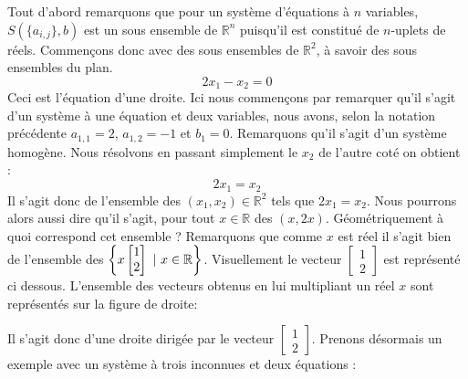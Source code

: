 \noindent Tout d'abord remarquons que pour un système d'équations à $n$ variables, $S(\{a_{i,j}\}, b)$ est un sous ensemble de $\mathbb{R}^n$ puisqu'il est constitué de $n$-uplets de réels. Commençons donc avec des sous ensembles de $\mathbb{R}^2$, à savoir des sous ensembles du plan. 
$$ 2x_1 - x_2 = 0 $$
\noindent Ceci est l'équation d'une droite. Ici nous commençons par remarquer qu'il s'agit d'un système à une équation et deux variables, nous avons, selon la notation précédente $a_{1,1} =2 $, $a_{1,2} = -1$ et  $b_1 = 0$. Remarquons qu'il s'agit d'un système homogène. Nous résolvons en passant simplement le $x_2$ de l'autre coté on obtient :
$$2x_1 = x_2$$
Il s'agit donc de l'ensemble des $(x_1, x_2) \in \mathbb{R}^2$ tels que $2x_1 = x_2$. Nous pourrons alors aussi dire qu'il s'agit, pour tout $x\in \mathbb{R}$ des $(x, 2x)$. Géométriquement à quoi correspond cet ensemble ? Remarquons que comme $x$ est réel il s'agit bien de l'ensemble des $\left\{x\begin{bmatrix}1 \\ 2 \end{bmatrix} \ | \ x \in \mathbb{R}\right\}$. Visuellement le vecteur $\begin{bmatrix}1 \\ 2 \end{bmatrix}$ est représenté ci dessous. L'ensemble des vecteurs obtenus en lui multipliant un réel $x$ sont représentés sur la figure de droite:
\begin{center}
\hspace{2CM}
\end{center}
Il s'agit donc d'une droite dirigée par le vecteur $\begin{bmatrix}1 \\ 2 \end{bmatrix}$. Prenons désormais un exemple avec un système à trois inconnues et deux équations :

